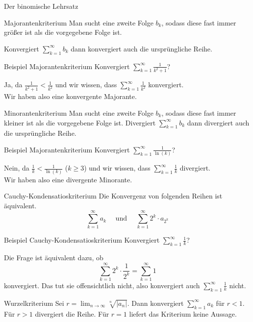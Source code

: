 \documentclass[german]{spicker}
\begin{document}
\begin{defi}{Der binomische Lehrsatz}
\begin{algo}{Majorantenkriterium}
    Man sucht eine zweite Folge $b_k$, sodass diese fast immer größer ist als die vorgegebene Folge ist.

    Konvergiert $\sum_{k=1}^{\infty} b_k$ dann konvergiert auch die ursprüngliche Reihe.
\end{algo}

\begin{bonus}{Beispiel Majorantenkriterium}
    Konvergiert $\sum_{k=1}^{\infty} \frac{1}{k^2+1}$?

    Ja, da $\frac{1}{k^2+1} < \frac{1}{k^2}$ und wir wissen, dass $\sum_{k=1}^{\infty} \frac{1}{k^2}$ konvergiert.\\
    Wir haben also eine konvergente Majorante.
\end{bonus}

\begin{algo}{Minorantenkriterium}
    Man sucht eine zweite Folge $b_k$, sodass diese fast immer kleiner ist als die vorgegebene Folge ist.
    Divergiert $\sum_{k=1}^{\infty} b_k$ dann divergiert auch die ursprüngliche Reihe.
\end{algo}

\begin{bonus}{Beispiel Majorantenkriterium}
    Konvergiert $\sum_{k=1}^{\infty} \frac{1}{\ln(k)}$?

    Nein, da $\frac{1}{k} < \frac{1}{\ln(k)}$ ($k\geq3$) und wir wissen, dass $\sum_{k=1}^{\infty} \frac{1}{k}$ divergiert.\\
    Wir haben also eine divergente Minorante.
\end{bonus}

\begin{algo}{Cauchy-Kondensatioskriterium}
    Die Konvergenz von folgenden Reihen ist äquivalent.
    $$
        \sum_{k=1}^{\infty} a_k \quad \text{ und } \quad
        \sum_{k=1}^{\infty} 2^k \cdot a_{2^k}
    $$
\end{algo}

\begin{bonus}{Beispiel Cauchy-Kondensatioskriterium}
    Konvergiert $\sum_{k=1}^{\infty} \frac{1}{k}$?

    Die Frage ist äquivalent dazu, ob
    \[
        \sum_{k=1}^{\infty} 2^k \cdot \frac{1}{2^k} = \sum_{k=1}^{\infty} 1
    \]
    konvergiert. Das tut sie offensichtlich nicht, also konvergiert auch $\sum_{k=1}^{\infty} \frac{1}{k}$ nicht.
\end{bonus}

\begin{algo}{Wurzelkriterium}
    Sei $r = \lim_{n\to\infty} \sqrt[n]{|a_n|}$.
    Dann konvergiert $\sum_{k=1}^{\infty} a_k$ für $r<1$.
    Für $r>1$ divergiert die Reihe.
    Für $r=1$ liefert das Kriterium keine Aussage.
\end{algo}


\end{defi}
\end{document}
